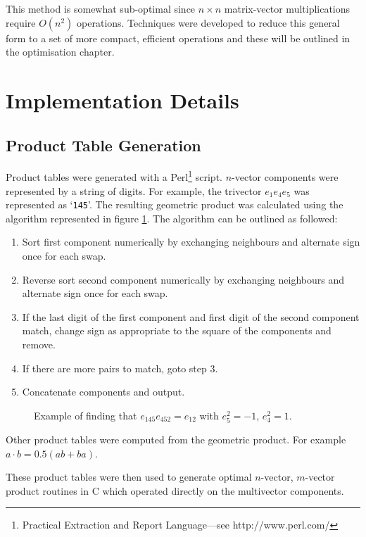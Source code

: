 This method is somewhat sub-optimal since $n \times n$ matrix-vector
multiplications require $O(n^2)$ operations. Techniques were developed to
reduce this general form to a set of more compact, efficient operations and
these will be outlined in the optimisation chapter.


\section{Implementation Details}

\subsection{Product Table Generation}


Product tables were generated with a Perl\footnote{Practical Extraction and Report
Language---see http://www.perl.com/} script. $n$-vector components were represented
by a string of digits. For example, the trivector $e_1e_4e_5$ was represented as
`{\tt 145}'. The resulting geometric product was calculated using the algorithm
represented in figure \ref{fig:symbolic}. The algorithm 
can be outlined as followed:

\begin{enumerate}
\item Sort first component numerically by exchanging neighbours and alternate sign
once for each swap.
\item Reverse sort second component numerically by exchanging neighbours and alternate sign
once for each swap.
\item If the last digit of the first component and first digit of the second
component match, change sign as appropriate to the square of the components and
remove.
\item If there are more pairs to match, goto step 3.
\item Concatenate components and output.
\end{enumerate}

\begin{figure}
\centering
{}
\caption{Example of finding that $e_{145}e_{452} = e_{12}$ with $e_5^2 = -1$, $e_4^2 = 1$.
\label{fig:symbolic}}
\end{figure}

Other product tables were computed from the geometric product. For example 
$a \cdot b = 0.5 (ab + ba)$.

These product tables were then used to generate optimal $n$-vector, $m$-vector product 
routines in C which operated directly on the multivector components.



